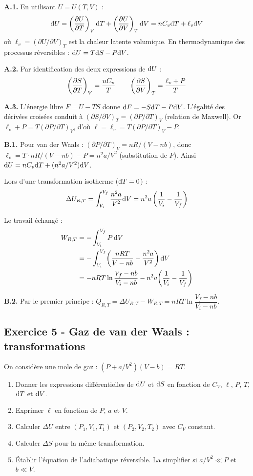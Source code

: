 \documentclass[12pt,a4paper]{article}
\begin{document}
\begin{boitecorrige}
\textbf{A.1.} En utilisant $U = U(T,V)$ :
\[
\mathrm{d} U = \left(\dfrac{\partial U}{\partial T}\right)_V\mathrm{d} T + \left(\dfrac{\partial U}{\partial V}\right)_T\mathrm{d} V = nC_v\mathrm{d} T + \ell_v\mathrm{d} V
\]
où $\ell_v = (\partial U/\partial V)_T$ est la chaleur latente volumique. En thermodynamique des processus réversibles : $\mathrm{d} U = T\mathrm{d} S - P\mathrm{d} V$.

\textbf{A.2.} Par identification des deux expressions de $\mathrm{d} U$ :
\[
\left(\dfrac{\partial S}{\partial T}\right)_V = \frac{nC_v}{T} \qquad \left(\dfrac{\partial S}{\partial V}\right)_T = \frac{\ell_v + P}{T}
\]

\textbf{A.3.} L'énergie libre $F = U - TS$ donne $\mathrm{d} F = -S\mathrm{d} T - P\mathrm{d} V$. L'égalité des dérivées croisées conduit à $(\partial S/\partial V)_T = (\partial P/\partial T)_V$ (relation de Maxwell). Or $\ell_v + P = T(\partial P/\partial T)_V$, d'où $\ell = \ell_v = T(\partial P/\partial T)_V - P$.

\textbf{B.1.} Pour van der Waals : $(\partial P/\partial T)_V = nR/(V-nb)$, donc $\ell_v = T\cdot nR/(V-nb) - P = n^2a/V^2$ (substitution de $P$). Ainsi $\mathrm{d} U = nC_v\mathrm{d} T + (n^2a/V^2)\mathrm{d} V$.

Lors d'une transformation isotherme ($\mathrm{d} T = 0$) :
\[
\Delta U_{R,T} = \int_{V_i}^{V_f}\frac{n^2 a}{V^2}\mathrm{d} V = n^2 a\left(\frac{1}{V_i}-\frac{1}{V_f}\right)
\]

Le travail échangé :
\begin{align*}
W_{R,T} &= -\int_{V_i}^{V_f}P\,\mathrm{d} V\\
        &= -\int_{V_i}^{V_f}\!\left(\frac{nRT}{V-nb}-\frac{n^2 a}{V^2}\right)\mathrm{d} V\\
        &= -nRT\ln\frac{V_f-nb}{V_i-nb} - n^2 a\!\left(\frac{1}{V_i}-\frac{1}{V_f}\right)
\end{align*}

\textbf{B.2.} Par le premier principe : $Q_{R,T} = \Delta U_{R,T} - W_{R,T} = nRT\ln\dfrac{V_f-nb}{V_i-nb}$.
\end{boitecorrige}

\subsection*{Exercice 5 - Gaz de van der Waals : transformations \niveau{\difficile}}

\begin{boiteexercice}
On considère une mole de gaz : $(P+a/V^2)(V-b) = RT$.
\begin{enumerate}
  \item Donner les expressions différentielles de $\mathrm{d} U$ et $\mathrm{d} S$ en fonction de $C_V$, $\ell$, $P$, $T$, $\mathrm{d} T$ et $\mathrm{d} V$.
  \item Exprimer $\ell$ en fonction de $P$, $a$ et $V$.
  \item Calculer $\Delta U$ entre $(P_1,V_1,T_1)$ et $(P_2,V_2,T_2)$ avec $C_V$ constant.
  \item Calculer $\Delta S$ pour la même transformation.
  \item Établir l'équation de l'adiabatique réversible. La simplifier si $a/V^2 \ll P$ et $b \ll V$.
\end{enumerate}
\end{boiteexercice}
\end{document}
